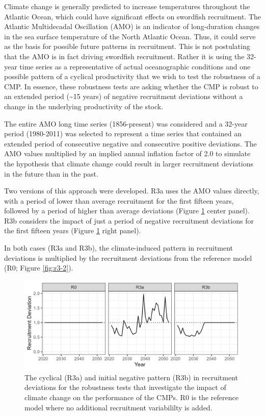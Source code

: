 \documentclass[
]{article}
\begin{document}
Climate change is generally predicted to increase temperatures throughout the Atlantic Ocean, which could have significant effects on swordfish recruitment. The Atlantic Multidecadal Oscillation (AMO) is an indicator of long-duration changes in the sea surface temperature of the North Atlantic Ocean. Thus, it could serve as the basis for possible future patterns in recruitment. This is not postulating that the AMO is in fact driving swordfish recruitment. Rather it is using the 32-year time series as a representative of actual oceanographic conditions and one possible pattern of a cyclical productivity that we wish to test the robustness of a CMP. In essence, these robustness tests are asking whether the CMP is robust to an extended period (\textasciitilde15 years) of negative recruitment deviations without a change in the underlying productivity of the stock.

The entire AMO long time series (1856-present) was considered and a 32-year period (1980-2011) was selected to represent a time series that contained an extended period of consecutive negative and consecutive positive deviations. The AMO values multiplied by an implied annual inflation factor of 2.0 to simulate the hypothesis that climate change could result in larger recruitment deviations in the future than in the past.

Two versions of this approach were developed. R3a uses the AMO values directly, with a period of lower than average recruitment for the first fifteen years, followed by a period of higher than average deviations (Figure \ref{fig:r3} center panel). R3b considers the impact of just a period of negative recruitment deviations for the first fifteen years (Figure \ref{fig:r3} right panel).

In both cases (R3a and R3b), the climate-induced pattern in recruitment deviations is multiplied by the recruitment deviations from the reference model (R0; Figure \ref{fig:r3-2}).

\begin{figure}
\includegraphics[width=25in]{../../img/R3/RecDevs_mean} \caption{The cyclical (R3a) and initial negative pattern (R3b) in recruitment deviations for the robustness tests that investigate the impact of climate change on the performance of the CMPs. R0 is the reference model where no additional recruitment variabililty is added.}\label{fig:r3}
\end{figure}
\end{document}
